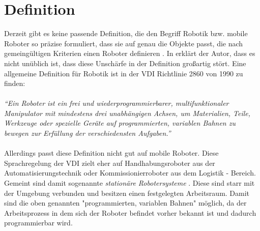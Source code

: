 \section{Definition}\label{s:definition}
Derzeit gibt es keine passende Definition, die den Begriff Robotik bzw. mobile Roboter so präzise formuliert, dass sie auf genau die Objekte passt, die nach gemeingültigen Kriterien einen Roboter definieren \cite{hertzberg2009mobile}. In \cite{hertzberg2009mobile} erklärt der Autor, dass es nicht unüblich ist, dass diese Unschärfe in der Definition großartig stört. Eine allgemeine Definition für Robotik ist in der \ac{VDI} Richtlinie 2860 von 1990 zu finden:
\\
\\
\textit{"`Ein Roboter ist ein frei und wiederprogrammierbarer, multifunktionaler Manipulator mit mindestens drei unabhängigen Achsen, um Materialien, Teile, Werkzeuge oder spezielle Geräte auf programmierten,
variablen Bahnen zu bewegen zur Erfüllung der verschiedensten Aufgaben."'}
\\
\\
Allerdings passt diese Definition nicht gut auf mobile Roboter. Diese Sprachregelung der \ac{VDI} zielt eher auf Handhabungsroboter aus der Automatisierungstechnik oder Kommissionierroboter aus dem Logistik - Bereich. Gemeint sind damit sogenannte \textit{stationäre Robotersysteme} \cite{Haun2007}. Diese sind starr mit der Umgebung verbunden und besitzen einen festgelegten Arbeitsraum. Damit sind die oben genannten "programmierten, variablen Bahnen" möglich, da der Arbeitsprozess in dem sich der Roboter befindet vorher bekannt ist und dadurch programmierbar wird. 

